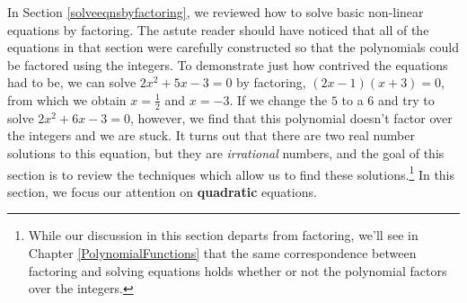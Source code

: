 \documentclass{ximera}
\begin{document}
	\author{Stitz-Zeager}




\setcounter{footnote}{0}

\label{AppQuadEqus}

In Section \ref{solveeqnsbyfactoring}, we reviewed how to solve basic non-linear equations by factoring.  The astute reader should have noticed that all of the equations in that section were carefully constructed so that the polynomials could be factored using the integers.  To demonstrate just how contrived the equations had to be, we can solve $2x^2+5x-3=0$ by factoring, $(2x-1)(x+3) = 0$, from which we obtain $x = \frac{1}{2}$ and $x = -3$.  If we change the $5$ to a $6$ and try to solve $2x^2 + 6x - 3 = 0$, however, we find that this polynomial doesn't factor over the integers and we are stuck.  It turns out that there are two real number solutions to this equation, but they are \textit{irrational} numbers, and the goal of this section is to review the techniques which allow us to find these solutions.\footnote{While our discussion in this section departs from factoring, we'll see in Chapter \ref{PolynomialFunctions} that the same correspondence between factoring and solving equations holds whether or not the polynomial factors over the integers.}  In this section, we focus our attention on \textbf{quadratic} equations.

\medskip
\end{document}
